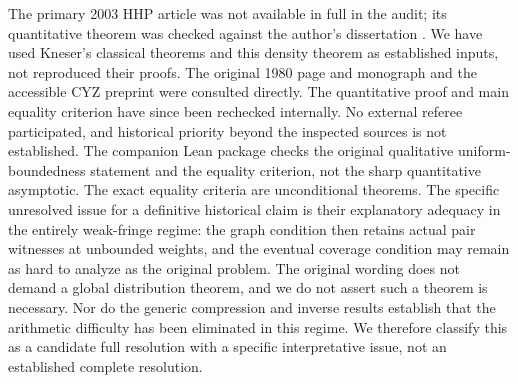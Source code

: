 \documentclass[11pt]{article}
\theoremstyle{remark}\newtheorem{remark}[theorem]{Remark}
\begin{document}
The primary 2003 HHP article was not available in full in the audit; its quantitative theorem was checked against the author's dissertation \cite[Theorem 4.8]{Heg}. We have used Kneser's classical theorems and this density theorem as established inputs, not reproduced their proofs. The original 1980 page and monograph and the accessible CYZ preprint were consulted directly. The quantitative proof and main equality criterion have since been rechecked internally. No external referee participated, and historical priority beyond the inspected sources is not established. The companion Lean package checks the original qualitative uniform-boundedness statement and the equality criterion, not the sharp quantitative asymptotic. The exact equality criteria are unconditional theorems. The specific unresolved issue for a definitive historical claim is their explanatory adequacy in the entirely weak-fringe regime: the graph condition then retains actual pair witnesses at unbounded weights, and the eventual coverage condition may remain as hard to analyze as the original problem. The original wording does not demand a global distribution theorem, and we do not assert such a theorem is necessary. Nor do the generic compression and inverse results establish that the arithmetic difficulty has been eliminated in this regime. We therefore classify this as a candidate full resolution with a specific interpretative issue, not an established complete resolution.
\end{document}
